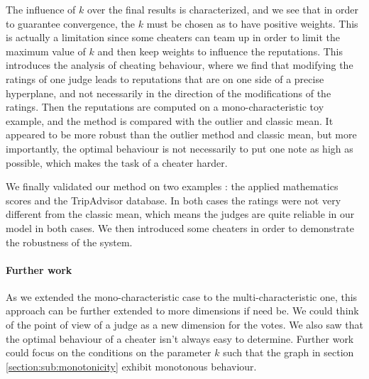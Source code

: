 \documentclass[12pt,a4paper]{article}
\begin{document}
The influence of $k$ over the final results is characterized, and we see that in order to guarantee convergence, the $k$ must be chosen as to have positive weights. This is actually a limitation since some cheaters can team up in order to limit the maximum value of $k$ and then keep weights to influence the reputations. This introduces the analysis of cheating behaviour, where we find that modifying the ratings of one judge leads to reputations that are on one side of a precise hyperplane, and not necessarily in the  direction of the modifications of the ratings. Then the reputations are computed on a mono-characteristic toy example, and the method is compared with the outlier and classic mean. It appeared to be more robust than the outlier method and classic mean, but more importantly, the optimal behaviour is not necessarily to put one note as high as possible, which makes the task of a cheater harder.

We finally validated our method on two examples : the applied mathematics scores and the TripAdvisor database. In both cases the ratings were not very different from the classic mean, which means the judges are quite reliable in our model in both cases. We then introduced some cheaters in order to demonstrate the robustness of the system.

\paragraph{Further work}
As we extended the mono-characteristic case to the multi-characteristic one, this approach can be further extended to more dimensions if need be. We could think of the point of view of a judge as a new dimension for the votes.
We also saw that the optimal behaviour of a cheater isn't always easy to determine. Further work could focus on the conditions on the parameter $k$ such that the graph in section \ref{section:sub:monotonicity} exhibit monotonous behaviour.


 

\nocite{*}
\end{document}
